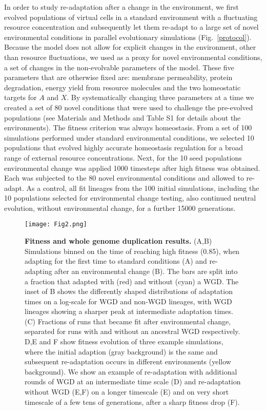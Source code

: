 In order to study re-adaptation after a change in the environment, we first evolved populations of virtual cells in a standard environment with a fluctuating resource concentration and subsequently let them re-adapt to a large set of novel environmental conditions in parallel evolutionary simulations (Fig.~\ref{protocol}). Because the model does not allow for explicit changes in the environment, other than resource fluctuations, we used as a proxy for novel environmental conditions, a set of changes in the non-evolvable parameters of the model. These five parameters that are otherwise fixed are: membrane permeability, protein degradation, energy yield from resource molecules and the two homeostatic targets for $A$ and $X$. By systematically changing three parameters at a time we created a set of 80 novel conditions that were used to challenge the pre-evolved populations (see Materials and Methods and Table S1 for details about the environments). The fitness criterion was always homeostasis. From a set of 100 simulations performed under standard environmental conditions, we selected 10 populations that evolved highly accurate homeostasis regulation for a broad range of external resource concentrations. Next, for the 10 seed populations environmental change was applied 1000 timesteps after high fitness was obtained. Each was subjected to the 80 novel environmental conditions and allowed to re-adapt. As a control, all fit lineages from the 100 initial simulations, including the 10 populations selected for environmental change testing, also continued neutral evolution, without environmental change, for a further 15000 generations.

\begin{figure*}
\begin{center}
\texttt{[image: Fig2.png]}
\end{center}
\caption{\textbf{Fitness and whole genome duplication results.} (A,B) Simulations binned on the time of reaching high fitness (0.85), when adapting for the first time to standard conditions (A) and re-adapting after an environmental change (B). The bars are split into a fraction that adapted with (red) and without (cyan) a WGD. The inset of B shows the differently shaped distributions of adaptation times on a log-scale for WGD and non-WGD lineages, with WGD lineages showing a sharper peak at intermediate adaptation times. (C) Fractions of runs that became fit after environmental change, separated for runs with and without an ancestral WGD respectively. D,E and F show fitness evolution of three example simulations, where the initial adaption (gray background) is the same and subsequent re-adaptation occurs in different environments (yellow background). We show an example of re-adaptation with additional rounds of WGD at an intermediate time scale (D) and re-adaptation without WGD (E,F) on a longer timescale (E) and on very short timescale of a few tens of generations, after a sharp fitness drop (F). }
\label{overview}
\end{figure*}

